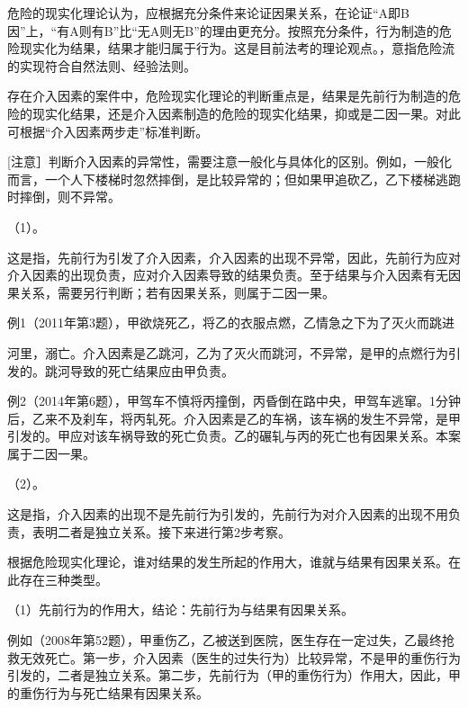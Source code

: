 危险的现实化理论认为，应根据充分条件来论证因果关系，在论证“A即B因”上，“有A则有B”比“无A则无B”的理由更充分。按照充分条件，行为制造的危险现实化为结果，结果才能归属于行为。这是目前法考的理论观点。，意指危险流的实现符合自然法则、经验法则。

存在介入因素的案件中，危险现实化理论的判断重点是，结果是先前行为制造的危险的现实化结果，还是介入因素制造的危险的现实化结果，抑或是二因一果。对此可根据“介入因素两步走”标准判断。



[注意］判断介入因素的异常性，需要注意一般化与具体化的区别。例如，一般化而言，一个人下楼梯时忽然摔倒，是比较异常的；但如果甲追砍乙，乙下楼梯逃跑时摔倒，则不异常。

（1）。

这是指，先前行为引发了介入因素，介入因素的出现不异常，因此，先前行为应对介入因素的出现负责，应对介入因素导致的结果负责。至于结果与介入因素有无因果关系，需要另行判断；若有因果关系，则属于二因一果。

例1（2011年第3题），甲欲烧死乙，将乙的衣服点燃，乙情急之下为了灭火而跳进

河里，溺亡。介入因素是乙跳河，乙为了灭火而跳河，不异常，是甲的点燃行为引发的。跳河导致的死亡结果应由甲负责。

例2（2014年第6题），甲驾车不慎将丙撞倒，丙昏倒在路中央，甲驾车逃窜。1分钟后，乙来不及刹车，将丙轧死。介入因素是乙的车祸，该车祸的发生不异常，是甲引发的。甲应对该车祸导致的死亡负责。乙的碾轧与丙的死亡也有因果关系。本案属于二因一果。

（2）。

这是指，介入因素的出现不是先前行为引发的，先前行为对介入因素的出现不用负责，表明二者是独立关系。接下来进行第2步考察。


根据危险现实化理论，谁对结果的发生所起的作用大，谁就与结果有因果关系。在此存在三种类型。

（1）先前行为的作用大，结论：先前行为与结果有因果关系。

例如（2008年第52题），甲重伤乙，乙被送到医院，医生存在一定过失，乙最终抢救无效死亡。第一步，介入因素（医生的过失行为）比较异常，不是甲的重伤行为引发的，二者是独立关系。第二步，先前行为（甲的重伤行为）作用大，因此，甲的重伤行为与死亡结果有因果关系。

